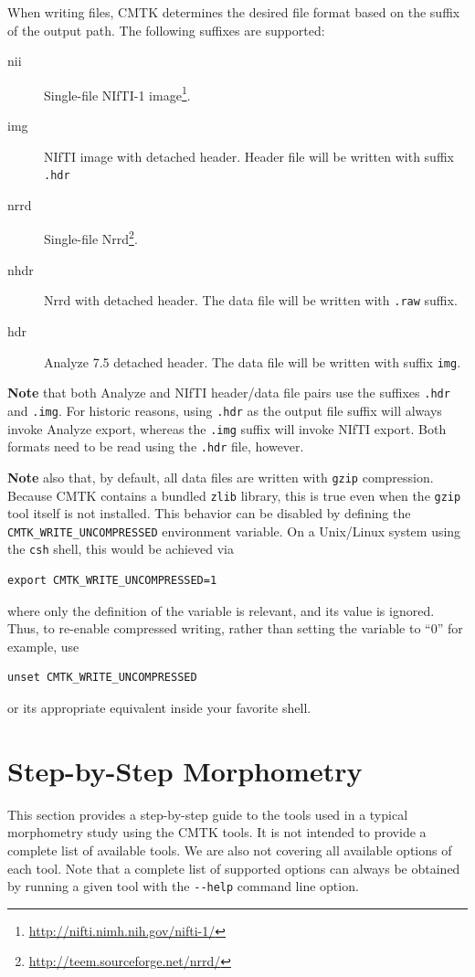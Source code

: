 \documentclass{InsightArticle}
\begin{document}
When writing files, CMTK determines the desired file format based on the
suffix of the output path. The following suffixes are supported:
\begin{description}
\item [nii] Single-file NIfTI-1 image\footnote{\url{http://nifti.nimh.nih.gov/nifti-1/}}.
\item [img] NIfTI image with detached header. Header file will be written with
  suffix \verb|.hdr|
\item [nrrd] Single-file Nrrd\footnote{\url{http://teem.sourceforge.net/nrrd/}}.
\item [nhdr] Nrrd with detached header. The data file will be written with
  \verb|.raw| suffix.
\item [hdr] Analyze 7.5 detached header. The data file will be written with
  suffix \verb|img|.
\end{description}

{\bf Note} that both Analyze and NIfTI header/data file pairs use the suffixes
\verb|.hdr| and \verb|.img|. For historic reasons, using \verb|.hdr| as the
output file suffix will always invoke Analyze export, whereas the \verb|.img|
suffix will invoke NIfTI export. Both formats need to be read using the
\verb|.hdr| file, however.

{\bf Note} also that, by default, all data files are written with \verb|gzip|
compression. Because CMTK contains a bundled \verb|zlib| library, this is true
even when the \verb|gzip| tool itself is not installed. This behavior can be
disabled by defining the \verb|CMTK_WRITE_UNCOMPRESSED| environment
variable. On a Unix/Linux system using the \verb|csh| shell, this would be
achieved via
\begin{verbatim}
export CMTK_WRITE_UNCOMPRESSED=1
\end{verbatim}
where only the definition of the variable is relevant, and its value is
ignored. Thus, to re-enable compressed writing, rather than setting the
variable to ``0'' for example, use
\begin{verbatim}
unset CMTK_WRITE_UNCOMPRESSED
\end{verbatim}
or its appropriate equivalent inside your favorite shell.

\clearpage
\section{Step-by-Step Morphometry}

This section provides a step-by-step guide to the tools used in a typical
morphometry study using the CMTK tools. It is not intended to provide a
complete list of available tools. We are also not covering all available
options of each tool. Note that a complete list of supported options can
always be obtained by running a given tool with the \verb|--help| command line
option.
\end{document}
